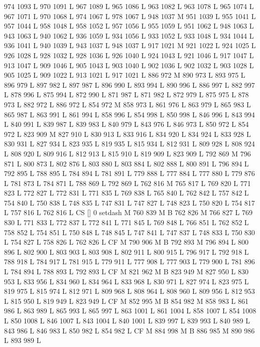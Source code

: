 {{{{{{{{{{{{{{{{{{{{{{{{{{{{{{974 1093 L
970 1091 L
967 1089 L
965 1086 L
963 1082 L
963 1078 L
965 1074 L
967 1071 L
970 1068 L
974 1067 L
978 1067 L
948 1037 M 951 1039 L
955 1041 L
957 1044 L
958 1048 L
958 1052 L
957 1056 L
955 1059 L
951 1062 L
948 1063 L
943 1063 L
940 1062 L
936 1059 L
934 1056 L
933 1052 L
933 1048 L
934 1044 L
936 1041 L
940 1039 L
943 1037 L
948 1037 L
917 1021 M 921 1022 L
924 1025 L
926 1028 L
928 1032 L
928 1036 L
926 1040 L
924 1043 L
921 1046 L
917 1047 L
913 1047 L
909 1046 L
905 1043 L
903 1040 L
902 1036 L
902 1032 L
903 1028 L
905 1025 L
909 1022 L
913 1021 L
917 1021 L
886 972 M 890 973 L
893 975 L
896 979 L
897 982 L
897 987 L
896 990 L
893 994 L
890 996 L
886 997 L
882 997 L
878 996 L
875 994 L
872 990 L
871 987 L
871 982 L
872 979 L
875 975 L
878 973 L
882 972 L
886 972 L
854 972 M 858 973 L
861 976 L
863 979 L
865 983 L
865 987 L
863 991 L
861 994 L
858 996 L
854 998 L
850 998 L
846 996 L
843 994 L
840 991 L
839 987 L
839 983 L
840 979 L
843 976 L
846 973 L
850 972 L
854 972 L
823 909 M 827 910 L
830 913 L
833 916 L
834 920 L
834 924 L
833 928 L
830 931 L
827 934 L
823 935 L
819 935 L
815 934 L
812 931 L
809 928 L
808 924 L
808 920 L
809 916 L
812 913 L
815 910 L
819 909 L
823 909 L
792 869 M 796 871 L
800 873 L
802 876 L
803 880 L
803 884 L
802 888 L
800 891 L
796 894 L
792 895 L
788 895 L
784 894 L
781 891 L
779 888 L
777 884 L
777 880 L
779 876 L
781 873 L
784 871 L
788 869 L
792 869 L
762 816 M 765 817 L
769 820 L
771 823 L
772 827 L
772 831 L
771 835 L
769 838 L
765 840 L
762 842 L
757 842 L
754 840 L
750 838 L
748 835 L
747 831 L
747 827 L
748 823 L
750 820 L
754 817 L
757 816 L
762 816 L
CS [] 0 setdash M
760 839 M B
762 826 M 766 827 L
769 830 L
771 833 L
772 837 L
772 841 L
771 845 L
769 848 L
766 851 L
762 852 L
758 852 L
754 851 L
750 848 L
748 845 L
747 841 L
747 837 L
748 833 L
750 830 L
754 827 L
758 826 L
762 826 L
CF M
790 906 M B
792 893 M 796 894 L
800 896 L
802 900 L
803 903 L
803 908 L
802 911 L
800 915 L
796 917 L
792 918 L
788 918 L
784 917 L
781 915 L
779 911 L
777 908 L
777 903 L
779 900 L
781 896 L
784 894 L
788 893 L
792 893 L
CF M
821 962 M B
823 949 M 827 950 L
830 953 L
833 956 L
834 960 L
834 964 L
833 968 L
830 971 L
827 974 L
823 975 L
819 975 L
815 974 L
812 971 L
809 968 L
808 964 L
808 960 L
809 956 L
812 953 L
815 950 L
819 949 L
823 949 L
CF M
852 995 M B
854 982 M 858 983 L
861 986 L
863 989 L
865 993 L
865 997 L
863 1001 L
861 1004 L
858 1007 L
854 1008 L
850 1008 L
846 1007 L
843 1004 L
840 1001 L
839 997 L
839 993 L
840 989 L
843 986 L
846 983 L
850 982 L
854 982 L
CF M
884 998 M B
886 985 M 890 986 L
893 989 L
}}}}}}}}}}}}}}}}}}}}}}}}}}}}}}
